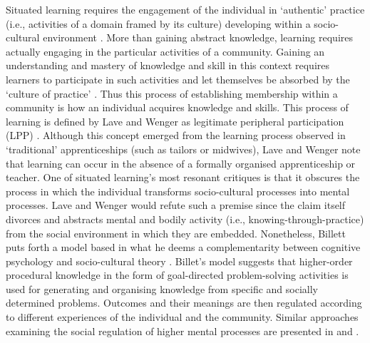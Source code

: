Situated learning requires the engagement of the individual in `authentic' practice (i.e., activities of a domain framed by its culture) developing within a socio-cultural environment \cite{Brown:1989}. More than gaining abstract knowledge, learning requires actually engaging in the particular activities of a community. Gaining an understanding and mastery of knowledge and skill in this context requires learners to participate in such activities and let themselves be absorbed by the `culture of practice' \cite{Lave:1991}. Thus this process of establishing membership within a community is how an individual acquires knowledge and skills. This process of learning is defined by Lave and Wenger as legitimate peripheral participation (LPP) \cite{Lave:1991}. Although this concept emerged from the learning process observed in `traditional' apprenticeships (such as tailors or midwives), Lave and Wenger note that learning can occur in the absence of a formally organised apprenticeship or teacher. One of situated learning's most resonant critiques is that it obscures the process in which the individual transforms socio-cultural processes into mental processes. Lave and Wenger would refute such a premise since the claim itself divorces and abstracts mental and bodily activity (i.e., knowing-through-practice) from the social environment in which they are embedded. Nonetheless, Billett puts forth a model based in what he deems a complementarity between cognitive psychology and socio-cultural theory \cite{Billett:1996}. Billet's model suggests that higher-order procedural knowledge in the form of goal-directed problem-solving activities is used for generating and organising knowledge from specific and socially determined problems. Outcomes and their meanings are then regulated according to different experiences of the individual and the community. Similar approaches examining the social regulation of higher mental processes are presented in \cite{Arievitch:2005} and \cite{Rambusch:2006}.   


